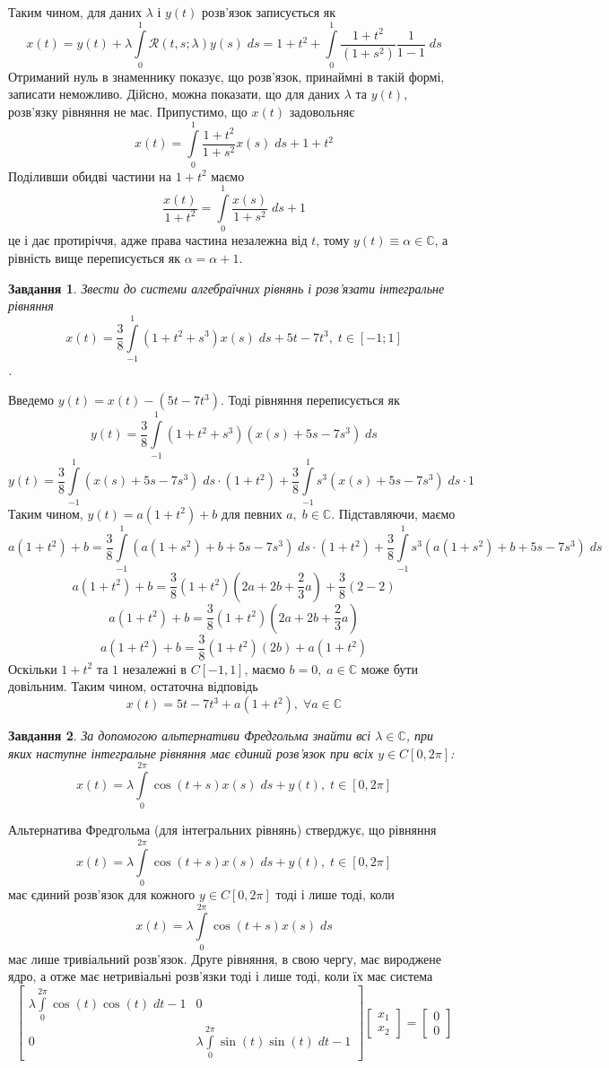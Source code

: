 \documentclass[10pt]{article}
\newtheorem{prob}{Завдання}
\newcommand{\ds}{\;ds}
\let\oldint\int
\renewcommand{\int}{\oldint\limits}
\begin{document}
	Таким чином, для даних $\lambda$ і $y(t)$ розв’язок записується як
	\[x(t)=y(t)+\lambda\int_{0}^1\mathcal{R}(t, s;\lambda)y( s)\;d s=1+t^2+\int_{0}^1\frac{1+t^2}{(1+s^2)}\frac{1}{1-1}\ds\]
	Отриманий нуль в знаменнику показує, що розв’язок, принаймні в такій формі, записати неможливо. Дійсно, можна показати, що для даних
	$\lambda$ та $y(t)$, розв’язку рівняння не має. Припустимо, що $x(t)$ задовольняє
	\[x(t)=\int_0^1\frac{1+t^2}{1+s^2}x(s)\ds+1+t^2\]
	Поділивши обидві частини на $1+t^2$ маємо
	\[\frac{x(t)}{1+t^2}=\int_0^1\frac{x(s)}{1+s^2}\ds+1\]
	це і дає протиріччя, адже права частина незалежна від $t$, тому $y(t)\equiv\alpha\in\mathbb{C}$, а рівність вище переписується як
	$\alpha=\alpha+1$.
\begin{prob}Звести до системи алгебраїчних рівнянь і розв’язати інтегральне рівняння
	\[x(t)=\frac{3}{8}\int_{-1}^1(1+t^2+s^3)x(s)\ds+5t-7t^3,\;t\in[-1;1]\].
\end{prob}
Введемо $y(t)=x(t)-(5t-7t^3)$. Тоді рівняння переписується як
	\[y(t)=\frac{3}{8}\int_{-1}^1(1+t^2+s^3)(x(s)+5s-7s^3)\ds\]
	\[y(t)=\frac{3}{8}\int_{-1}^1(x(s)+5s-7s^3)\ds\cdot(1+t^2)+\frac{3}{8}\int_{-1}^1s^3(x(s)+5s-7s^3)\ds\cdot1\]
	Таким чином, $y(t)=a(1+t^2)+b$ для певних $a,\;b\in\mathbb{C}$. Підставляючи, маємо
	\[a(1+t^2)+b=\frac{3}{8}\int_{-1}^1(a(1+s^2)+b+5s-7s^3)\ds\cdot(1+t^2)+\frac{3}{8}\int_{-1}^1s^3(a(1+s^2)+b+5s-7s^3)\ds\]
	\[a(1+t^2)+b=\frac{3}{8}(1+t^2)(2a+2b+\frac{2}{3}a)+\frac{3}{8}(2-2)\]
	\[a(1+t^2)+b=\frac{3}{8}(1+t^2)(2a+2b+\frac{2}{3}a)\]
	\[a(1+t^2)+b=\frac{3}{8}(1+t^2)(2b)+a(1+t^2)\]
	Оскільки $1+t^2$ та $1$ незалежні в $C[-1,1]$, маємо $b=0,\;a\in\mathbb{C}$ може бути довільним. Таким чином, остаточна відповідь
	\[x(t)=5t-7t^3+a(1+t^2),\;\forall a\in\mathbb{C}\]%
\begin{prob}За допомогою альтернативи Фредгольма знайти всі $\lambda\in\mathbb{C}$, при яких наступне інтегральне рівняння має єдиний
	розв’язок при всіх $y\in C[0,2\pi]$:
	\[x(t)=\lambda\int_0^{2\pi}\cos(t+s)x(s)\ds+y(t),\;t\in[0,2\pi]\]
\end{prob}
Альтернатива Фредгольма (для інтегральних рівнянь) стверджує, що рівняння 
	\[x(t)=\lambda\int_0^{2\pi}\cos(t+s)x(s)\ds+y(t),\;t\in[0,2\pi]\]
	має єдиний розв’язок для кожного $y\in C[0,2\pi]$ тоді і лише тоді, коли
	\[x(t)=\lambda\int_0^{2\pi}\cos(t+s)x(s)\ds\]
має лише тривіальний розв’язок. Друге рівняння, в свою чергу, має вироджене
ядро, а отже має нетривіальні розв’язки тоді і лише тоді, коли їх має система
\[\begin{bmatrix}\lambda\int_0^{2\pi}\cos(t)\cos(t)\;dt-1&0\\0&\lambda\int_0^{2\pi}\sin(t)\sin(t)\;dt-1\end{bmatrix}
	\begin{bmatrix}x_1\\x_2\end{bmatrix}=\begin{bmatrix}0\\0\end{bmatrix}\]
\end{document}
